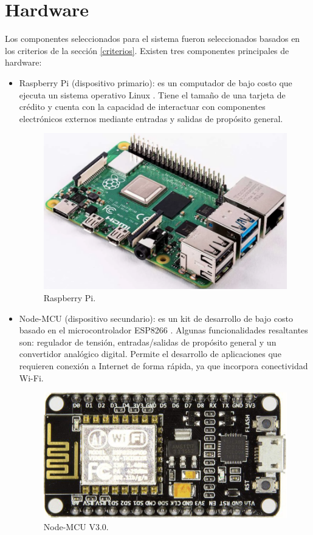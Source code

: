 \section{Hardware}

Los componentes seleccionados para el sistema fueron seleccionados basados en los criterios de la sección \ref{criterios}. Existen tres componentes principales de hardware:  

\begin{itemize}
\item Raspberry Pi (dispositivo primario): es un computador de bajo costo que ejecuta un sistema operativo Linux \cite{RPI}. Tiene el tamaño de una tarjeta de crédito y cuenta con la capacidad de interactuar con componentes electrónicos externos mediante entradas y salidas de propósito general.

\begin{figure}[h]
	\centering
	\includegraphics[scale=.25]{./Figures/Capitulo2/Figura_B.png}
	\caption{Raspberry Pi.}
	\label{fig:figura_b1}
\end{figure}


\item Node-MCU (dispositivo secundario): es un kit de desarrollo de bajo costo basado en el microcontrolador ESP8266 \cite{NODEMCU}. Algunas funcionalidades resaltantes son: regulador de tensión, entradas/salidas de propósito general y un  convertidor analógico digital. Permite el desarrollo de aplicaciones que requieren conexión a Internet de forma rápida, ya que incorpora conectividad Wi-Fi.

\begin{figure}[h]
	\centering
	\includegraphics[scale=.25]{./Figures/Capitulo2/Figura_C.png}
	\caption{Node-MCU V3.0.}
	\label{fig:figura_c1}
\end{figure}


\end{itemize}
